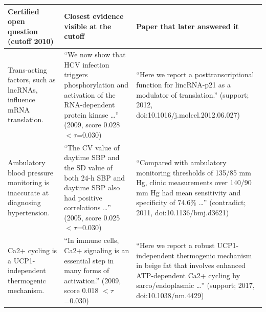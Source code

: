 \begin{tabular}{>{\raggedright\arraybackslash}p{3.6cm}>{\raggedright\arraybackslash}p{5.6cm}>{\raggedright\arraybackslash}p{7.2cm}}
\toprule
Certified open question (cutoff 2010) & Closest evidence visible at the cutoff & Paper that later answered it \\
\midrule
Trans-acting factors, such as lncRNAs, influence mRNA translation. & ``We now show that HCV infection triggers phosphorylation and activation of the RNA-dependent protein kinase \ldots{}'' (2009, score 0.028 $<\tau$=0.030) & ``Here we report a posttranscriptional function for lincRNA-p21 as a modulator of translation.'' (support; 2012, doi:10.1016/j.molcel.2012.06.027) \\
Ambulatory blood pressure monitoring is inaccurate at diagnosing hypertension. & ``The CV value of daytime SBP and the SD value of both 24-h SBP and daytime SBP also had positive correlations \ldots{}'' (2005, score 0.025 $<\tau$=0.030) & ``Compared with ambulatory monitoring thresholds of 135/85 mm Hg, clinic measurements over 140/90 mm Hg had mean sensitivity and specificity of 74.6\% \ldots{}'' (contradict; 2011, doi:10.1136/bmj.d3621) \\
Ca2+ cycling is a UCP1-independent thermogenic mechanism. & ``In immune cells, Ca2+ signaling is an essential step in many forms of activation.'' (2009, score 0.018 $<\tau$=0.030) & ``Here we report a robust UCP1-independent thermogenic mechanism in beige fat that involves enhanced ATP-dependent Ca2+ cycling by sarco/endoplasmic \ldots{}'' (support; 2017, doi:10.1038/nm.4429) \\
\bottomrule
\end{tabular}
